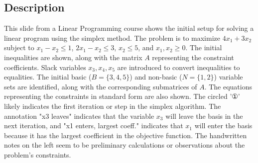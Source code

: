 \documentclass{article}%
\begin{document}
\subsection{Description}%
This slide from a Linear Programming course shows the initial setup for solving a linear program using the simplex method.  The problem is to maximize $4x_1 + 3x_2$ subject to $x_1 - x_2 \le 1$, $2x_1 - x_2 \le 3$, $x_2 \le 5$, and $x_1, x_2 \ge 0$.  The initial inequalities are shown, along with the matrix $A$ representing the constraint coefficients.  Slack variables $x_3, x_4, x_5$ are introduced to convert inequalities to equalities. The initial basic ($B = \{3, 4, 5\}$) and non-basic ($N = \{1, 2\}$) variable sets are identified, along with the corresponding submatrices of $A$. The equations representing the constraints in standard form are also shown.  The circled '①' likely indicates the first iteration or step in the simplex algorithm.  The annotation "x3 leaves" indicates that the variable $x_3$ will leave the basis in the next iteration, and "x1 enters, largest coeff." indicates that $x_1$ will enter the basis because it has the largest coefficient in the objective function.  The handwritten notes on the left seem to be preliminary calculations or observations about the problem's constraints.%
\end{document}

